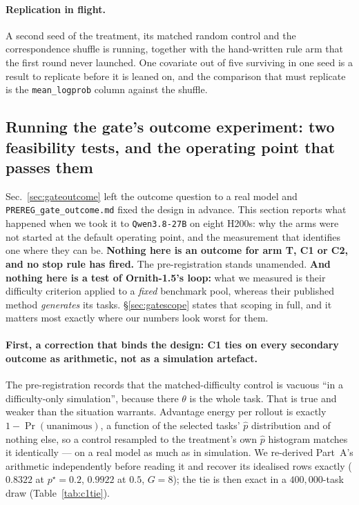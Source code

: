 \paragraph{Replication in flight.} A second seed of the treatment, its matched random control
and the correspondence shuffle is running, together with the hand-written rule arm that the
first round never launched. One covariate out of five surviving in one seed is a result to
replicate before it is leaned on, and the comparison that must replicate is the
\texttt{mean\_logprob} column against the shuffle.

\subsection{Running the gate's outcome experiment: two feasibility tests, and the operating
point that passes them}
\label{sec:gatefeasibility}

Sec.~\ref{sec:gateoutcome} left the outcome question to a real model and
\texttt{PREREG\_gate\_outcome.md} fixed the design in advance. This section reports what
happened when we took it to \texttt{Qwen3.8-27B} on eight H200s: why the arms were not started
at the default operating point, and the measurement that identifies one where they can be.
\textbf{Nothing here is an outcome for arm T, C1 or C2, and no stop rule has fired.} The
pre-registration stands unamended. \textbf{And nothing here is a test of Ornith-1.5's loop:}
what we measured is their difficulty criterion applied to a \emph{fixed} benchmark pool,
whereas their published method \emph{generates} its tasks. \S\ref{sec:gatescope} states that
scoping in full, and it matters most exactly where our numbers look worst for them.

\paragraph{First, a correction that binds the design: C1 ties on every secondary outcome as
arithmetic, not as a simulation artefact.} The pre-registration records that the
matched-difficulty control is vacuous ``in a difficulty-only simulation'', because there
$\theta$ is the whole task. That is true and weaker than the situation warrants. Advantage
energy per rollout is exactly $1-\Pr(\text{unanimous})$, a function of the selected tasks'
$\hat p$ distribution and of nothing else, so a control resampled to the treatment's own
$\hat p$ histogram matches it identically --- on a real model as much as in simulation. We
re-derived Part~A's arithmetic independently before reading it and recover its idealised rows
exactly ($0.8322$ at $p^\star=0.2$, $0.9922$ at $0.5$, $G=8$); the tie is then exact in a
$400{,}000$-task draw (Table~\ref{tab:c1tie}).


